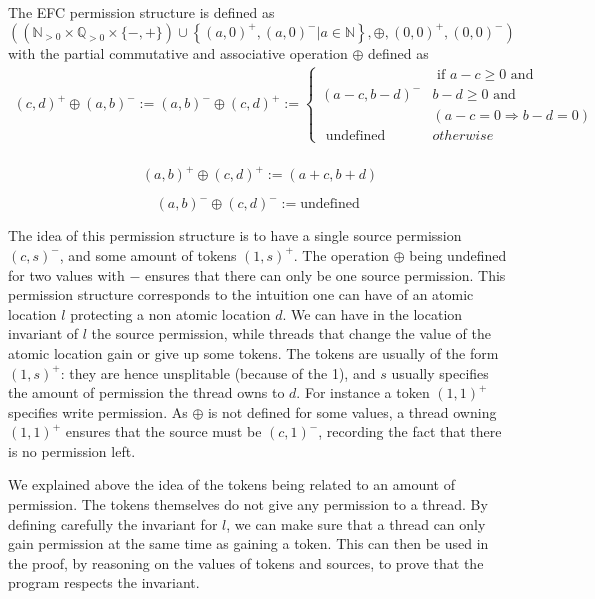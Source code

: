 The EFC permission structure is defined as 
\[\left(\left(\mathbb{N}_{>0} \times \mathbb{Q}_{>0} \times\{-,+\}\right) \cup\left\{(a, 0)^{+},(a, 0)^{-} | a \in \mathbb{N}\right\}, \oplus,(0,0)^{+},(0,0)^{-}\right)\]
with the partial commutative and associative operation $\oplus$ defined as 
\[\begin{array}{r}
{(c, d)^{+} \oplus(a, b)^{-} :=(a, b)^{-} \oplus(c, d)^{+} :=
\left\{\begin{array}{cl}
&{\text { if } a-c }{\geq 0 \text { and }} \\ 

{(a-c, b-d)^{-}} & {b-d }{\geq 0 \text { and }} 
\\ &({a-c}  {=0 \Rightarrow} {b-d}  {=0})\\

{\text { undefined }}&{{otherwise }}
\end{array}\right.} \\ 
\end{array}
\]
		
\[(a, b)^{+} \oplus(c, d)^{+} :=(a+c, b+d)\]

\[(a, b)^{-} \oplus(c, d)^{-} :=\text {undefined }\]

The idea of this permission structure is to have a single source permission $(c, s)^-$, and some amount of tokens $(1, s)^+$. The operation $\oplus$ being undefined for two values with $-$ ensures that there can only be one source permission. This permission structure corresponds to the intuition one can have of an atomic location $l$ protecting a non atomic location $d$. We can have in the location invariant of $l$ the source permission, while threads that change the value of the atomic location gain or give up some tokens. The tokens are usually of the form $(1, s)^+$: they are hence unsplitable (because of the 1), and $s$ usually specifies the amount of permission the thread owns to $d$. For instance a token $(1, 1)^+$ specifies write permission. As $\oplus$ is not defined for some values, a thread owning $(1, 1)^+$ ensures that the source must be $(c, 1)^-$, recording the fact that there is no permission left.

We explained above the idea of the tokens being related to an amount of permission. The tokens themselves do not give any permission to a thread. By defining carefully the invariant for $l$, we can make sure that a thread can only gain permission at the same time as gaining a token. This can then be used in the proof, by reasoning on the values of tokens and sources, to prove that the program respects the invariant.

